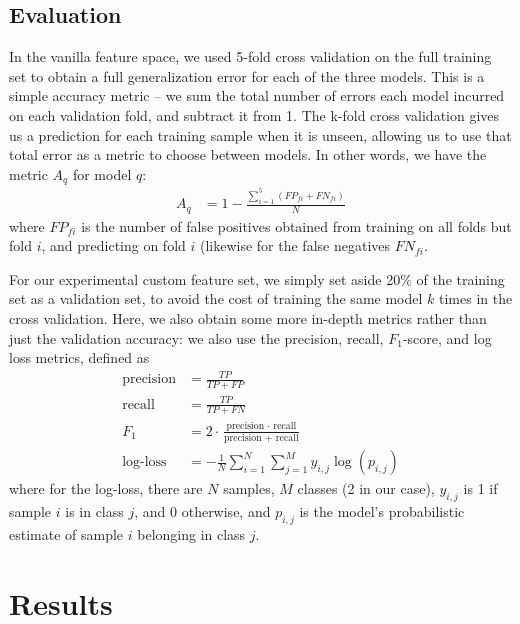 \documentclass{article} %
\begin{document}
\subsection{Evaluation}
In the vanilla feature space, we used 5-fold cross validation on the full training set to obtain a full generalization error for each of the three models.  This is a simple accuracy metric -- we sum the total number of errors each model incurred on each validation fold, and subtract it from 1.  The k-fold cross validation gives us a prediction for each training sample when it is unseen, allowing us to use that total error as a metric to choose between models.  In other words, we have the metric $A_q$ for model $q$:
\begin{align*}
A_q &= 1 - \frac{\sum_{i=1}^5(FP_{fi} + FN_{fi})}{N}
\end{align*}
where $FP_{fi}$ is the number of false positives obtained from training on all folds but fold $i$, and predicting on fold $i$ (likewise for the false negatives $FN_{fi}$.\par
For our experimental custom feature set, we simply set aside 20\% of the training set as a validation set, to avoid the cost of training the same model $k$ times in the cross validation.  Here, we also obtain some more in-depth metrics rather than just the validation accuracy: we also use the precision, recall, $F_1$-score, and log loss metrics, defined as
\begin{align*}
\text{precision} &= \frac{TP}{TP + FP}\\
\text{recall} &= \frac{TP}{TP + FN}\\
F_1 &= 2 \cdot \frac{\text{precision } \cdot \text{ recall}}{\text{precision } + \text{ recall}}\\
\text{log-loss} &= -\frac{1}{N}\sum_{i=1}^N\sum_{j=1}^My_{i,j}\log(p_{i,j})
\end{align*}
where for the log-loss, there are $N$ samples, $M$ classes (2 in our case), $y_{i,j}$ is 1 if sample $i$ is in class $j$, and 0 otherwise, and $p_{i,j}$ is the model's probabilistic estimate of sample $i$ belonging in class $j$.
\section{Results}
\end{document}
